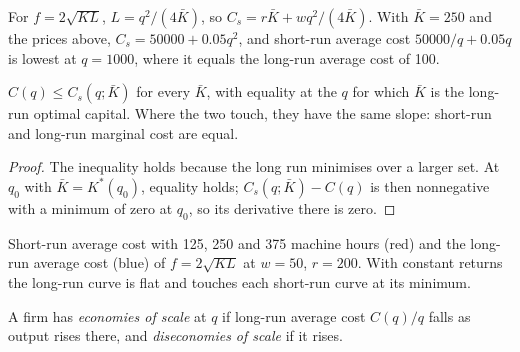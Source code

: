 For $f = 2\sqrt{KL}$, $L = q^2/(4\bar K)$, so
$C_s = r\bar K + wq^2/(4\bar K)$. With $\bar K = 250$ and the prices above,
$C_s = 50000 + 0.05q^2$, and short-run average cost $50000/q + 0.05q$ is lowest
at $q = 1000$, where it equals the long-run average cost of 100.

\begin{proposition}\label{prop:b1:cost-minimisation:envelope}
$C(q) \le C_s(q; \bar K)$ for every $\bar K$, with equality at the $q$ for which
$\bar K$ is the long-run optimal capital. Where the two touch, they have the
same slope: short-run and long-run marginal cost are equal.
\end{proposition}

\begin{proof}
The inequality holds because the long run minimises over a larger set. At
$q_0$ with $\bar K = K^*(q_0)$, equality holds; $C_s(q; \bar K) - C(q)$ is then
nonnegative with a minimum of zero at $q_0$, so its derivative there is
zero.
\end{proof}

\begin{omfigure}

{\small Short-run average cost with 125, 250 and 375 machine hours (red) and the
long-run average cost (blue) of $f = 2\sqrt{KL}$ at $w = 50$, $r = 200$. With constant
returns the long-run curve is flat and touches each short-run curve at its
minimum.}
\end{omfigure}

\begin{definition}\label{def:b1:cost-minimisation:economies-of-scale}
A firm has \emph{economies of scale} at $q$ if long-run average cost
$C(q)/q$ falls as output rises there, and \emph{diseconomies of scale} if it
rises.
\end{definition}

